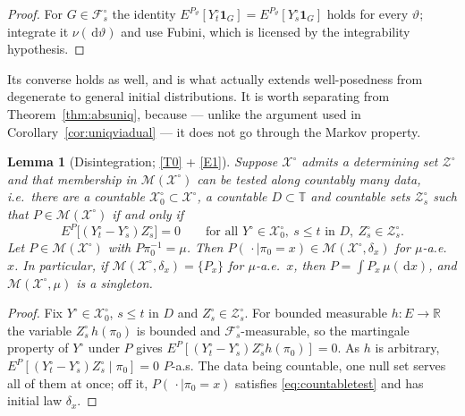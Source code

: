 \documentclass[11pt,a4paper]{article}
\theoremstyle{plain}
\newtheorem{lemma}[theorem]{Lemma}
\theoremstyle{definition}
\theoremstyle{remark}
\newcommand{\R}{\mathbb{R}}
\newcommand{\T}{\mathbb{T}}                     %
\newcommand{\Filt}{\mathcal{F}}
\newcommand{\XX}{\mathcal{X}}                  %
\newcommand{\ZZ}{\mathcal{Z}}                  %
\newcommand{\Msol}{\mathcal{M}}
\newcommand{\one}{\mathbf{1}}
\newcommand{\dif}{\,\mathrm{d}}
\begin{document}
\begin{proof}
  For $G \in \Filt^\circ_s$ the identity
  $E^{P_\vartheta}[Y^\circ_t \one_G] = E^{P_\vartheta}[Y^\circ_s \one_G]$ holds
  for every $\vartheta$; integrate it $\nu(\dif\vartheta)$ and use Fubini, which
  is licensed by the integrability hypothesis.
\end{proof}

Its converse holds as well, and is what actually extends well-posedness from
degenerate to general initial distributions.  It is worth separating from
Theorem~\ref{thm:absuniq}, because --- unlike the argument used in
Corollary~\ref{cor:uniqviadual} --- it does not go through the Markov property.

\begin{lemma}[Disintegration; \eqref{T0} + \eqref{E1}]
  \label{lem:disint}
  Suppose $\XX^\circ$ admits a determining set $\ZZ^\circ$ and that membership in
  $\Msol(\XX^\circ)$ can be tested along countably many data, i.e.\ there are a
  countable $\XX^\circ_0 \subset \XX^\circ$, a countable $D \subset \T$ and
  countable sets $\ZZ^\circ_s$ such that $P \in \Msol(\XX^\circ)$ if and only if
  \begin{equation}
    \label{eq:countabletest}
    E^P\bigl[ (Y^\circ_t - Y^\circ_s) Z^\circ_s \bigr] = 0
    \qquad \text{for all } Y^\circ \in \XX^\circ_0,\ s \leq t \text{ in } D,\
    Z^\circ_s \in \ZZ^\circ_s .
  \end{equation}
  Let $P \in \Msol(\XX^\circ)$ with $P\pi_0^{-1} = \mu$.  Then
  $P(\,\cdot \mid \pi_0 = x) \in \Msol(\XX^\circ, \delta_x)$ for $\mu$-a.e.\ $x$.
  In particular, if $\Msol(\XX^\circ,\delta_x) = \{P_x\}$ for $\mu$-a.e.\ $x$,
  then $P = \int P_x \, \mu(\dif x)$, and $\Msol(\XX^\circ,\mu)$ is a singleton.
\end{lemma}

\begin{proof}
  Fix $Y^\circ \in \XX^\circ_0$, $s \leq t$ in $D$ and $Z^\circ_s \in \ZZ^\circ_s$.
  For bounded measurable $h : E \to \R$ the variable $Z^\circ_s\, h(\pi_0)$ is
  bounded and $\Filt^\circ_s$-measurable, so the martingale property of $Y^\circ$
  under $P$ gives $E^P[(Y^\circ_t - Y^\circ_s) Z^\circ_s h(\pi_0)] = 0$.  As $h$
  is arbitrary,
  $E^P[(Y^\circ_t - Y^\circ_s) Z^\circ_s \mid \pi_0] = 0$ $P$-a.s.  The data being
  countable, one null set serves all of them at once; off it,
  $P(\,\cdot \mid \pi_0 = x)$ satisfies \eqref{eq:countabletest} and has initial
  law $\delta_x$.
\end{proof}
\end{document}
